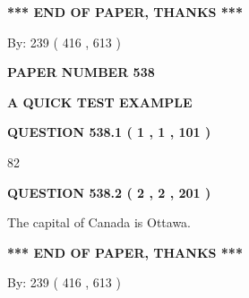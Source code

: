 \documentclass[12pt]{article}
\begin{document}
\vspace{1.0in} 
{\textbf{\large{ *** END OF PAPER, THANKS *** }}} 
   
   
\hspace{1.0in} By: 
 239 ( 416 ,  613 )
   
   
   
   
\newpage 
\setcounter{page}{ 
   538001 } 
   
   
   
   
 {\textbf{ \Large{ PAPER NUMBER  538  }}}
   
   
\vspace{0.2in}
   
   
   
   
   
   
 \vspace{0.2in}
{\LARGE {\textbf{ A QUICK TEST EXAMPLE}}}
   
   
  
\vspace{0.2in}
  
{\textbf{\Large{QUESTION
538.1 
 ( 1 , 1 , 101 )
}}}
  
  
 
 
\noindent{}

82
 
 
  
\vspace{0.2in}
  
{\textbf{\Large{QUESTION
538.2 
 ( 2 , 2 , 201 )
}}}
  
  
 
 
\noindent{}
 
 
The capital of Canada is Ottawa.
 
 
 
 
   
   
 \vspace{0.2in}
 
   
   
   
   
\vspace{1.0in} 
{\textbf{\large{ *** END OF PAPER, THANKS *** }}} 
   
   
\hspace{1.0in} By: 
 239 ( 416 ,  613 )
   
\end{document}
